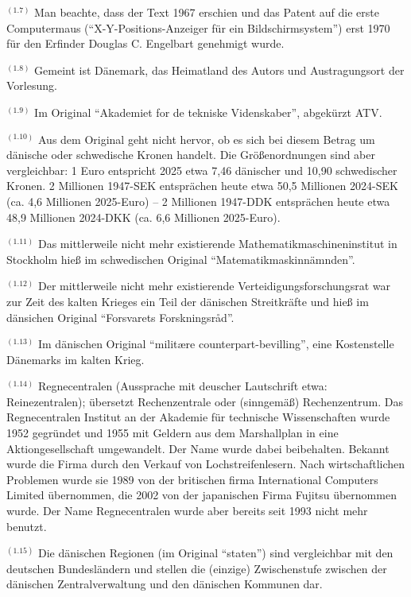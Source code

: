 $^{(1.7)}$ Man beachte, dass der Text 1967 erschien und das Patent auf die erste Computermaus (\enquote{X-Y-Positions-Anzeiger für ein Bildschirmsystem}) erst 1970 für den Erfinder Douglas C. Engelbart genehmigt wurde.

$^{(1.8)}$ Gemeint ist Dänemark, das Heimatland des Autors und Austragungsort der Vorlesung.

$^{(1.9)}$ Im Original \enquote{Akademiet for de tekniske Videnskaber}, abgekürzt ATV.

$^{(1.10)}$ Aus dem Original geht nicht hervor, ob es sich bei diesem Betrag um dänische oder schwedische Kronen handelt. Die Größenordnungen sind aber vergleichbar: 1 Euro entspricht 2025 etwa 7,46 dänischer und 10,90 schwedischer Kronen. 2 Millionen 1947-SEK entsprächen heute etwa 50,5 Millionen 2024-SEK (ca. 4,6 Millionen 2025-Euro) -- 2 Millionen 1947-DDK entsprächen heute etwa 48,9 Millionen 2024-DKK (ca. 6,6 Millionen 2025-Euro).

$^{(1.11)}$ Das mittlerweile nicht mehr existierende Mathematikmaschineninstitut in Stockholm hieß im schwedischen Original \enquote{Matematikmaskinnämnden}.

$^{(1.12)}$ Der mittlerweile nicht mehr existierende Verteidigungsforschungsrat war zur Zeit des kalten Krieges ein Teil der dänischen Streitkräfte und hieß im dänsichen Original \enquote{Forsvarets Forskningsråd}.

$^{(1.13)}$ Im dänischen Original \enquote{militære counterpart-bevilling}, eine Kostenstelle Dänemarks im kalten Krieg.

$^{(1.14)}$ Regnecentralen (Aussprache mit deuscher Lautschrift etwa: Reinezentralen); übersetzt Rechenzentrale oder (sinngemäß) Rechenzentrum. Das Regnecentralen Institut an der Akademie für technische Wissenschaften wurde 1952 gegründet und 1955 mit Geldern aus dem Marshallplan in eine Aktiongesellschaft umgewandelt. Der Name wurde dabei beibehalten. Bekannt wurde die Firma durch den Verkauf von Lochstreifenlesern. Nach wirtschaftlichen Problemen wurde sie 1989 von der britischen firma International Computers Limited übernommen, die 2002 von der japanischen Firma Fujitsu übernommen wurde. Der Name Regnecentralen wurde aber bereits seit 1993 nicht mehr benutzt.

$^{(1.15)}$ Die dänischen Regionen (im Original \enquote{staten}) sind vergleichbar mit den deutschen Bundesländern und stellen die (einzige) Zwischenstufe zwischen der dänischen Zentralverwaltung und den dänischen Kommunen dar. 

